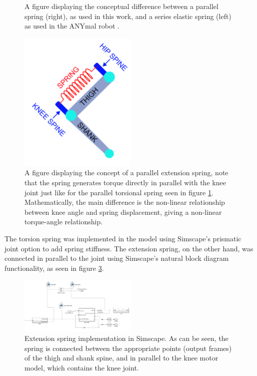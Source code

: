 \begin{figure}[htbp]
\begin{minipage}[t]{0.45\textwidth}
    \end{minipage}
    \caption{A figure displaying the conceptual difference between a parallel spring (right), as used in this work, and a series elastic spring (left) as used in the ANYmal robot \cite{hutter_anymal_2016}.}
    \label{fig:parallel_vs_series_spring}
\end{figure}


\begin{figure}
    \centering
    \includegraphics[width=0.5\textwidth]{Images/DOF2_w_extension_spring.png}
    \caption{A figure displaying the concept of a parallel extension spring, note that the spring generates torque directly in parallel with the knee joint just like for the parallel torsional spring seen in figure \ref{fig:parallel_vs_series_spring}. Mathematically, the main difference is the non-linear relationship between knee angle and spring displacement, giving a non-linear torque-angle relationship.}
    \label{fig:extension_spring}
\end{figure}

The torsion spring was implemented in the model using Simscape's prismatic joint option to add spring stiffness. The extension spring, on the other hand, was connected in parallel to the joint using Simscape's natural block diagram functionality, as seen in figure \ref{fig:simscape_extension_spring}. 

\begin{figure}
    \centering
    \includegraphics[width=0.5\textwidth]{Images/simscape_extension_spring.png}
    \caption{Extension spring implementation in Simscape. As can be seen, the spring is connected between the appropriate points (output frames) of the thigh and shank spine, and in parallel to the knee motor model, which contains the knee joint.}
    \label{fig:simscape_extension_spring}
\end{figure}

